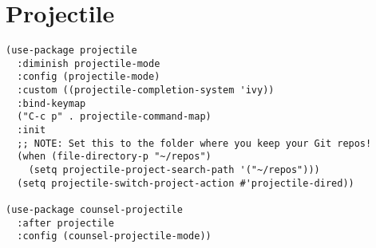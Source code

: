 \documentclass[11pt]{article}
\begin{document}
\section{Projectile}
\label{sec:org647f010}
\begin{verbatim}
(use-package projectile
  :diminish projectile-mode
  :config (projectile-mode)
  :custom ((projectile-completion-system 'ivy))
  :bind-keymap
  ("C-c p" . projectile-command-map)
  :init
  ;; NOTE: Set this to the folder where you keep your Git repos!
  (when (file-directory-p "~/repos")
    (setq projectile-project-search-path '("~/repos")))
  (setq projectile-switch-project-action #'projectile-dired))

(use-package counsel-projectile
  :after projectile
  :config (counsel-projectile-mode))
\end{verbatim}
\end{document}
